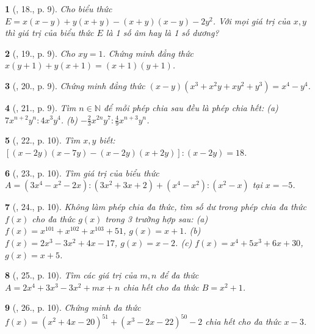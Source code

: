 \documentclass{article}
\newtheorem{baitoan}{}
\begin{document}
\begin{baitoan}[\cite{Tuyen_Toan_8}, 18., p. 9]
	Cho biểu thức $E = x(x - y) + y(x + y) - (x + y)(x - y) - 2y^2$. Với mọi giá trị của $x,y$ thì giá trị của biểu thức $E$ là 1 số âm hay là 1 số dương?
\end{baitoan}

\begin{baitoan}[\cite{Tuyen_Toan_8}, 19., p. 9]
	Cho $xy = 1$. Chứng minh đẳng thức $x(y + 1) + y(x + 1) = (x + 1)(y + 1)$.
\end{baitoan}

\begin{baitoan}[\cite{Tuyen_Toan_8}, 20., p. 9]
	Chứng minh đẳng thức $(x - y)(x^3 + x^2y + xy^2 + y^3) = x^4 - y^4$.
\end{baitoan}

\begin{baitoan}[\cite{Tuyen_Toan_8}, 21., p. 9]
	Tìm $n\in\mathbb{N}$ để mỗi phép chia sau đều là phép chia hết: (a) $7x^{n+2}y^n:4x^3y^4$. (b) $-\frac{2}{3}x^{2n}y^7:\frac{4}{9}x^{n+3}y^n$.
\end{baitoan}

\begin{baitoan}[\cite{Tuyen_Toan_8}, 22., p. 10]
	Tìm $x,y$ biết: $[(x - 2y)(x - 7y) - (x - 2y)(x + 2y)]:(x - 2y) = 18$.
\end{baitoan}

\begin{baitoan}[\cite{Tuyen_Toan_8}, 23., p. 10]
	Tìm giá trị của biểu thức $A = (3x^4 - x^2 - 2x):(3x^2 + 3x + 2) + (x^4 - x^2):(x^2 - x)$ tại $x = -5$.
\end{baitoan}

\begin{baitoan}[\cite{Tuyen_Toan_8}, 24., p. 10]
	Không làm phép chia đa thức, tìm số dư trong phép chia đa thức $f(x)$ cho đa thức $g(x)$ trong 3 trường hợp sau: (a) $f(x) = x^{101} + x^{102} + x^{103} + 51$, $g(x) = x + 1$. (b) $f(x) = 2x^3 - 3x^2 + 4x - 17$, $g(x) = x - 2$. (c) $f(x) = x^4 + 5x^3 + 6x + 30$, $g(x) = x + 5$.
\end{baitoan}

\begin{baitoan}[\cite{Tuyen_Toan_8}, 25., p. 10]
	Tìm các giá trị của $m,n$ để đa thức $A = 2x^4 + 3x^3 - 3x^2 + mx + n$ chia hết cho đa thức $B = x^2 + 1$.
\end{baitoan}

\begin{baitoan}[\cite{Tuyen_Toan_8}, 26., p. 10]
	Chứng minh đa thức $f(x) = (x^2 + 4x - 20)^{51} + (x^3 - 2x - 22)^{50} - 2$ chia hết cho đa thức $x - 3$.
\end{baitoan}
\end{document}
